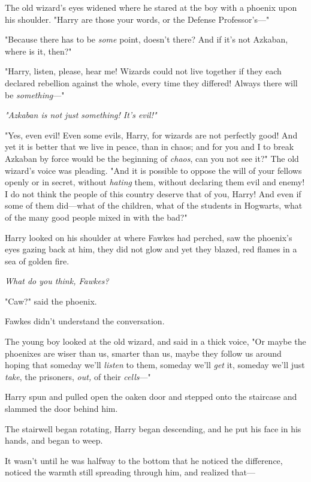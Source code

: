 The old wizard's eyes widened where he stared at the boy with a phoenix upon
his shoulder. "Harry{\el} are those your words, or the Defense
Professor's\mbox{---}"

"Because there has to be \emph{some} point, doesn't there? And if it's not
Azkaban, where is it, then?"

"Harry, listen, please, hear me! Wizards could not live together if they each
declared rebellion against the whole, every time they differed! Always there
will be \emph{something}\mbox{---}"

\emph{"Azkaban is not just something! It's evil!"}

"Yes, even evil! Even some evils, Harry, for wizards are not perfectly good!
And yet it is better that we live in peace, than in chaos; and for you and I to
break Azkaban by force would be the beginning of \emph{chaos}, can you not see
it?" The old wizard's voice was pleading. "And it is possible to oppose the
will of your fellows openly or in secret, without \emph{hating} them, without
declaring them evil and enemy! I do not think the people of this country
deserve that of you, Harry! And even if some of them did---what of the
children, what of the students in Hogwarts, what of the many good people mixed
in with the bad?"

Harry looked on his shoulder at where Fawkes had perched, saw the phoenix's
eyes gazing back at him, they did not glow and yet they blazed, red flames in a
sea of golden fire.

\emph{What do you think, Fawkes?}

"Caw?" said the phoenix.

Fawkes didn't understand the conversation.

The young boy looked at the old wizard, and said in a thick voice, "Or maybe
the phoenixes are wiser than us, smarter than us, maybe they follow us around
hoping that someday we'll \emph{listen} to them, someday we'll \emph{get} it,
someday we'll just \emph{take}, the prisoners, \emph{out,} of their
\emph{cells}\mbox{---}"

Harry spun and pulled open the oaken door and stepped onto the staircase and
slammed the door behind him.

The stairwell began rotating, Harry began descending, and he put his face in
his hands, and began to weep.

It wasn't until he was halfway to the bottom that he noticed the difference,
noticed the warmth still spreading through him, and realized that\mbox{---}


